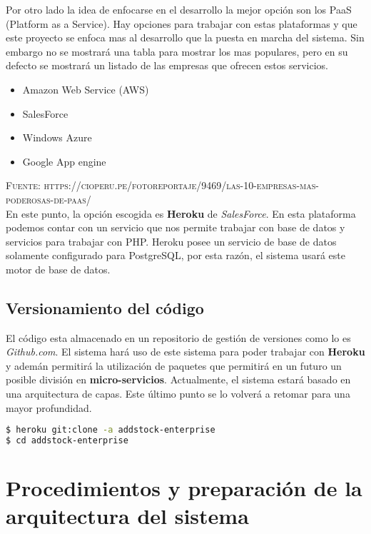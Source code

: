 Por otro lado la idea de enfocarse en el desarrollo la mejor opción son los PaaS (Platform as a Service). Hay opciones para trabajar con estas plataformas y que este proyecto se enfoca mas al desarrollo que la puesta en marcha del sistema. Sin embargo no se mostrará una tabla para mostrar los mas populares, pero en su defecto se mostrará un listado de las empresas que ofrecen estos servicios.

\begin{itemize}
\item Amazon Web Service (AWS)
\item SalesForce
\item Windows Azure
\item Google App engine
\end{itemize}
\textsc{Fuente: https://cioperu.pe/fotoreportaje/9469/las-10-empresas-mas-poderosas-de-paas/}\\

En este punto, la opción escogida es \textbf{Heroku} de \textit{SalesForce}. En esta plataforma podemos contar con un servicio que nos permite trabajar con base de datos y servicios para trabajar con PHP. Heroku posee un servicio de base de datos solamente configurado para PostgreSQL, por esta razón, el sistema usará este motor de base de datos.

\subsection{Versionamiento del código}

El código esta almacenado en un repositorio de gestión de versiones como lo es \textit{Github.com}. El sistema hará uso de este sistema para poder trabajar con \textbf{Heroku} y ademán permitirá la utilización de paquetes que permitirá en un futuro un posible división en \textbf{micro-servicios}. Actualmente, el sistema estará basado en una arquitectura de capas. Este último punto se lo volverá a retomar para una mayor profundidad.\\

\begin{lstlisting}[language=bash]
$ heroku git:clone -a addstock-enterprise
$ cd addstock-enterprise
\end{lstlisting}

\section{Procedimientos y preparación de la arquitectura del sistema}

